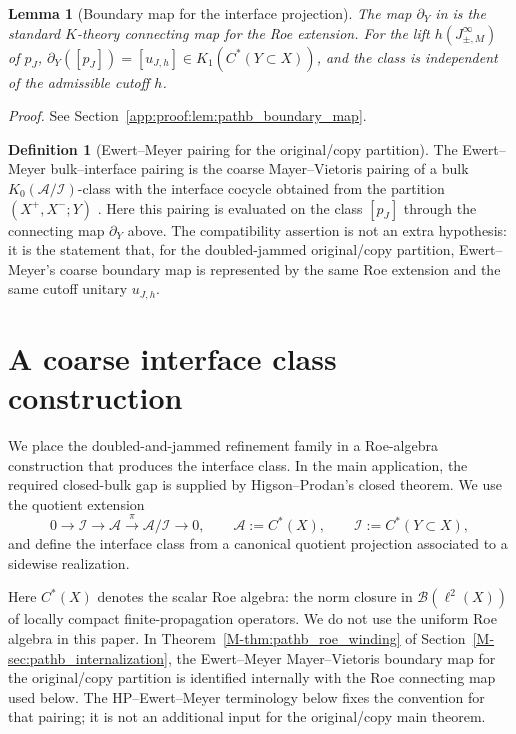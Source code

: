 \documentclass[11pt]{article}
\numberwithin{equation}{section}
\newtheorem{lemma}[theorem]{Lemma}
\theoremstyle{definition}
\newtheorem{definition}[theorem]{Definition}
\theoremstyle{remark}
\newcommand{\proofref}[1]{%
  \par\noindent\emph{Proof.} See Section~\ref{#1}.\par\medskip
}
\newcommand{\proofappendixref}[1]{\proofref{#1}}
\begin{document}
\begin{lemma}[Boundary map for the interface projection]\label{lem:pathb_boundary_map}
The map $\partial_Y$ in  is the standard $K$-theory connecting
map for the Roe extension. For the lift $h(J_{\pm,M}^\infty)$ of $p_J$,
\(\partial_Y([p_J])=[u_{J,h}]\in K_1(C^*(Y\subset X))\), and the class is independent of the
admissible cutoff $h$.
\end{lemma}
\proofappendixref{app:proof:lem:pathb_boundary_map}

\begin{definition}[Ewert--Meyer pairing for the original/copy partition]\label{def:pathb_em_pairing}
The Ewert--Meyer bulk--interface pairing is the coarse Mayer--Vietoris pairing of a bulk
$K_0(\mathcal A/\mathcal I)$-class with the interface cocycle obtained from the partition
$(X^+,X^-;Y)$ \cite{EwertMeyer2019}. Here this pairing is evaluated on the class $[p_J]$ through
the connecting map $\partial_Y$ above. The compatibility assertion is not an extra hypothesis: it
is the statement that, for the doubled-jammed original/copy partition, Ewert--Meyer's coarse
boundary map is represented by the same Roe extension and the same cutoff unitary $u_{J,h}$.
\end{definition}


\section{A coarse interface class construction}\label{sec:bulkboundary}

We place the doubled-and-jammed refinement family in a Roe-algebra construction that produces the
interface class. In the main application, the required closed-bulk gap is supplied by
Higson--Prodan's closed theorem. We use the
quotient extension
\[
0 \longrightarrow \mathcal I \longrightarrow \mathcal A \xrightarrow{\;\pi\;} \mathcal A/\mathcal I
\longrightarrow 0,
\qquad
\mathcal A:=C^*(X),
\qquad
\mathcal I:=C^*(Y\subset X),
\]
and define the interface class from a canonical quotient projection associated to a sidewise
realization.

Here \(C^*(X)\) denotes the scalar Roe algebra: the norm closure in
\(\mathcal B(\ell^2(X))\) of locally compact finite-propagation operators. We do not use the
uniform Roe algebra in this paper. In Theorem~\ref{M-thm:pathb_roe_winding} of
Section~\ref{M-sec:pathb_internalization}, the Ewert--Meyer Mayer--Vietoris boundary map for the
original/copy partition is identified internally with the Roe connecting map used below. The
HP--Ewert--Meyer terminology below fixes the convention for that pairing; it is not an additional
input for the original/copy main theorem.
\end{document}
